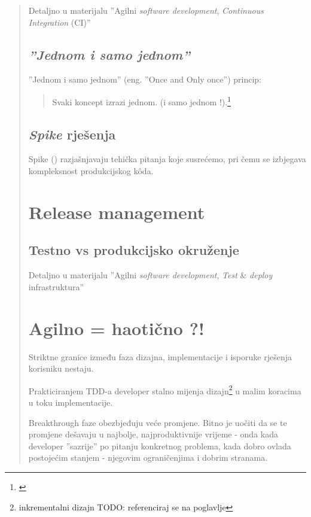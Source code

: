 \documentclass[lmodern, utf8, zavrsni]{fit}
\begin{document}
\begin{quote}
Detaljno u materijalu ''Agilni \emph{software development}, \emph{Continuous Integration} (CI)''\citep{agileci}

\section{\emph{''Jednom i samo jednom''}}

''Jednom i samo jednom'' (eng. ''Once and Only once'') princip:

\begin{quotation}
  Svaki koncept izrazi jednom. (i samo jednom !).\footnote{\citep[str. 319]{agileart}}
\end{quotation}


\section{\emph{Spike} rješenja}

Spike (\href{http://translate.google.com/#en/hr/spike}{\color{blue}{bos. ekser, smeč}}) razjašnjavaju tehička pitanja koje susrećemo, pri čemu se izbjegava kompleksnost produkcijskog k\^oda.\citep[str. 334]{agileart}


\chapter{Release management}

\section{Testno vs produkcijsko okruženje}

Detaljno u materijalu ''Agilni \emph{software development}, \emph{Test} \& \emph{deploy} infrastruktura''\citep{agiletestdeploy}

\chapter{Agilno = haotično ?!}

Striktne granice između faza dizajna, implementacije i isporuke rješenja korisniku nestaju.

Prakticiranjem TDD-a developer stalno mijenja dizajn\footnote{inkrementalni dizajn TODO: referenciraj se na poglavlje} u malim koracima u toku implementacije.

Breakthrough faze obezbjeđuju veće promjene. Bitno je uočiti da se te promjene dešavaju u najbolje, najproduktivnije vrijeme - onda kada developer ''sazrije'' po pitanju konkretnog problema, kada dobro ovlada postojećim stanjem - njegovim ograničenjima i dobrim stranama.


\end{quote}
\end{document}
